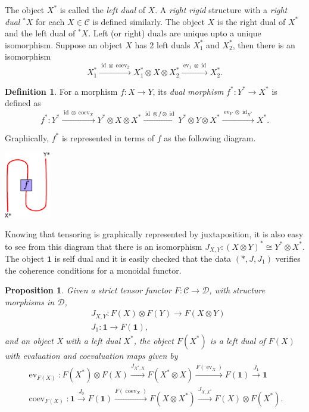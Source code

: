 \documentclass[a4paper, 10pt]{book}
\newtheorem{Prop}[theorem]{Proposition}
\theoremstyle{definition}
\newtheorem{Def}[theorem]{Definition}
\numberwithin{equation}{chapter}
\newcommand\id{\operatorname{id}}
\newcommand\ot{\otimes}
\newcommand\C{\mathcal C}
\newcommand\D{\mathcal D}
\newcommand\one{\mathbf{1}}
\newcommand\ev{\operatorname{ev}}
\newcommand\coev{\operatorname{coev}}
\begin{document}
The object $X^*$ is called the \textit{left dual} of $X$. A \textit{right rigid} structure with a \textit{right dual} ${}^*X$ for each $X\in \C$ is defined similarly. The object $X$ is the right dual of $X^*$ and the left dual of ${}^*X$. Left (or right) duals are unique upto a unique isomorphism. Suppose an object $X$ has 2 left duals $X_1^*$ and $X_2^*$, then there is an isomorphism \begin{equation*}
	X_1^* \xrightarrow{\id \otimes \coev_2} X_1^* \otimes X\otimes X_2^*  \xrightarrow{\ev_1 \otimes \id} X_2^*.
\end{equation*}

\begin{Def}\label{fstar}
For a morphism $f:X\rightarrow Y$, its \textit{dual morphism} $f^*: Y^* \rightarrow X^*$ is defined as 
\begin{equation}
	f^*:Y^*\xrightarrow{\id\otimes \coev_X} Y^* \otimes X\otimes X^* \nonumber  \xrightarrow {\id \otimes f \otimes \id} Y^* \otimes Y \otimes X^* \xrightarrow{\ev_Y \otimes \id_{X^*}} X^*.
\end{equation}
\end{Def}
Graphically, $f^*$ is represented in terms of $f$ as the following diagram.
\begin{center}
\includegraphics[width=0.15\textwidth]{fdual.eps}
\end{center}
Knowing that tensoring is graphically represented by juxtaposition, it is also easy to see from this diagram that there is an isomorphism $J_{X,Y}: (X\ot Y)^* \cong Y^* \ot X^*$. The object $\one$ is self dual and it is easily checked that the data $(*, J, J_1)$ verifies the coherence conditions for a monoidal functor.
\begin{Prop}
Given a strict tensor functor $F:\C \rightarrow \D$, with structure morphisms in $\D$, \begin{align}
	&J_{X,Y} : F(X) \otimes F(Y) \rightarrow F(X\otimes Y)\\
	&J_1 : \one \rightarrow F(\one),
\end{align}
and an object X with a left dual $X^*$, the object $F(X^*)$ is a left dual of $F(X)$ with evaluation and coevaluation maps given by
\begin{align}
	\ev_{F(X)}: F(X^*)\otimes F(X) \xrightarrow{J_{X^*, X}} F(X^*\otimes X) \xrightarrow{F(\ev_X)}F(\one) \xrightarrow{J_1} \one\\
	\coev_{F(X)}: \one \xrightarrow{J_0} F(\one) \xrightarrow{F(\coev_X)} F(X\otimes X^*) \xrightarrow{J_{X, X^*}} F(X) \otimes F(X^*).
\end{align}
\end{Prop}
\end{document}
